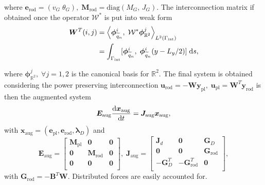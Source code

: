 \documentclass[letterpaper, 10 pt, conference]{ieeeconf}
\begin{document}
where $\bm{e}_{\text{rod}} = (v_G\; \theta_{G}), \; \bm{M}_{\text{rod}} = \mathrm{diag}(M_G, \, J_G)$. The interconnection matrix if obtained once the operator $\mathcal{W}^*$ is put into weak form
\begin{align*}
\bm{W}^T(i,j) &= \left\langle \bm{\phi}^i_{\widetilde{q}_n}, \; \mathcal{W}^* \bm{\phi}^j_{\mathbb{R}^2} \right\rangle_{L^2(\Gamma_{\text{int}})} \\
&= \int_{\Gamma_{\text{int}}} [\bm{\phi}^i_{\widetilde{q}_n}, \; \bm{\phi}^i_{\widetilde{q}_n} (y - L_y/2) ]\d{s},
\end{align*}

where $\bm{\phi}^j_{\mathbb{R}^2},  \; \forall j = 1,2$ is the canonical basis for $\mathbb{R}^2$. The final system is obtained considering the power preserving interconnection $\bm{u}_{\text{rod}} = - \bm{W} \bm{y}_{\text{pl}}, \; \bm{u}_{\text{pl}} = \bm{W}^T \bm{y}_{\text{rod}}$ is then the augmented system 
\begin{equation}
\bm{E}_{\text{aug}} \diff{\bm{x}_{\text{aug}}}{t} = \bm{J}_{\text{aug}}\bm{x}_{\text{aug}}, 
\end{equation}
with $\bm{x}_{\text{aug}} = (\bm{e}_{\text{pl}}, \bm{e}_{\text{rod}}, \bm{\lambda}_D)$ and
\begin{equation}
\label{eq:aug_Int}
\bm{E}_{\text{aug}} = 
\begin{bmatrix}
\bm{M}_{\text{pl}} & \bm{0} & \bm{0} \\
\bm{0} & \bm{M}_{\text{rod}} &\bm{0} \\
\bm{0} & \bm{0} &\bm{0} \\
\end{bmatrix}, \;
\bm{J}_{\text{aug}}=\begin{bmatrix}
\bm{J}_d & \bm{0} & \bm{G}_D \\
\bm{0} & \bm{0} & \bm{G}_{\text{rod}}\\
-\bm{G}_D^T & -\bm{G}_{\text{rod}}^T & \bm{0} \\
\end{bmatrix},
\end{equation}
with $\bm{G}_{\text{rod}} = -\bm{B}^T\bm{W}$. Distributed forces are easily accounted for. 
 
\end{document}
